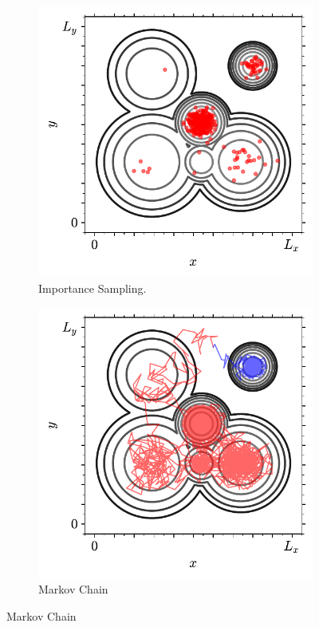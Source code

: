 \begin{figure}[bt]
     \begin{subfigure}[b]{0.45\textwidth}
         \centering
         \includegraphics[width=\textwidth]{./figures/methods/mc_2d_imp.pdf}
         \caption{Importance Sampling.}
         \label{fig:montecarloint3}
     \end{subfigure}
     \hfill
     \begin{subfigure}[b]{0.45\textwidth}
         \centering
         \includegraphics[width=\textwidth]{./figures/methods/mc_2d_mcmc.pdf}
         \caption{Markov Chain \mc}
         \label{fig:montecarloint4}
     \end{subfigure}
     \hfill
    

\end{figure}

